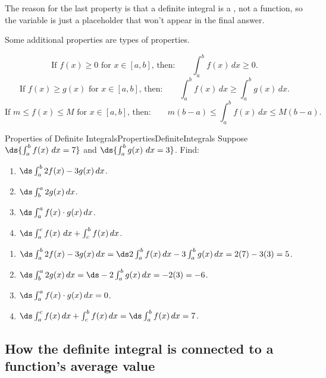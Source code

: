 The reason for the last property is that a definite integral is a , not a function, so the variable is just a placeholder that won't appear in the final answer.

Some additional properties are  types of properties.

\begin{formulabox}
$$\mbox{If $f(x)\geq 0$ for $x\in[a,b]$, then:}\qquad\int_a^b f(x)\,dx\geq 0.$$
$$\mbox{If $f(x)\geq g(x)$ for $x\in[a,b]$, then:}\qquad\int_a^b f(x)\,dx\geq \int_a^b g(x)\,dx.$$
$$\mbox{If $m\leq f(x)\leq M$ for $x\in[a,b]$, then:}\qquad m(b-a)\leq \int_a^b f(x)\,dx\leq M(b-a).$$
\end{formulabox}

\begin{example}{Properties of Definite Integrals}{PropertiesDefiniteIntegrals}
Suppose $\ds{\int_a^b f(x)~dx=7}$ and $\ds{\int_a^b g(x)~dx=3}$. Find:
\begin{multicols}{2}
\begin{enumerate}
	\item	$\ds\int_a^b 2f(x)-3g(x)\,dx$.
	\item	$\ds\int_{b}^{a} 2g(x)\,dx$.
	\item	$\ds\int_a^a f(x)\cdot g(x)\,dx$.
	\item	$\ds\int_a^c f(x)~dx+\int_c^b f(x)\,dx$.
\end{enumerate}
\end{multicols}
\vspace{5mm}
\end{example}
\begin{solution}
\begin{enumerate}
	\item	$\ds\int_a^b 2f(x)-3g(x)\,dx=\ds 2\int_a^b f(x)\,dx-3\int_a^b g(x)\,dx=2(7)-3(3)=5$.
	\item	$\ds\int_{b}^{a} 2g(x)\,dx=\ds -2\int_{a}^{b} g(x)\,dx=-2(3)=-6$.
	\item	$\ds\int_a^a f(x)\cdot g(x)\,dx=0$.
	\item	$\ds\int_a^c f(x)\,dx+\int_c^b f(x)\,dx=\ds\int_a^b f(x)\,dx=7$.
\end{enumerate}
\end{solution}


\subsection{How the definite integral is connected to a function's average value} 

